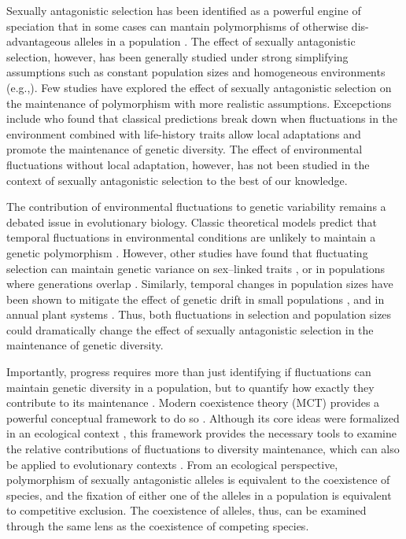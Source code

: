 \documentclass[12pt]{article}
\begin{document}
Sexually antagonistic selection has been identified as a powerful engine of speciation that in some cases can mantain polymorphisms of otherwise dis-advantageous alleles in a population \citep{gavrilets2014sexual}. The effect of sexually antagonistic selection, however, has been generally studied under strong simplifying assumptions such as constant population sizes and homogeneous environments (e.g.,\citet{kidwell1977regions, pamilo1979genic, immler2012ploidally}). Few studies have explored the effect of sexually antagonistic selection on the maintenance of polymorphism with more realistic assumptions. Excepctions include \citet{connallon_evolutionary_2018} who found that classical predictions break down when fluctuations in the environment combined with life-history traits allow local adaptations and promote the maintenance of genetic diversity. The effect of environmental fluctuations without local adaptation, however, has not been studied in the context of sexually antagonistic selection to the best of our knowledge.


The contribution of environmental fluctuations to genetic variability remains a debated issue in evolutionary biology. Classic theoretical models predict that temporal fluctuations in environmental conditions are unlikely to maintain a genetic polymorphism \citep{hedrick1974genetic,hedrick1986genetic}. However, other studies have found that fluctuating selection can maintain genetic variance on sex--linked traits \citep{reinhold2000maintenance}, or in populations where generations overlap \citep{ellner1994role, ellner1996patterns}. Similarly, temporal changes in population sizes have been shown to mitigate the effect of genetic drift in small populations \citep{pemberton1996maintenance}, and in annual plant systems \citep{nunney2002effective}. Thus, both fluctuations in selection and population sizes could dramatically change the effect of sexually antagonistic selection in the maintenance of genetic diversity.


Importantly, progress requires more than just identifying if fluctuations can maintain genetic diversity in a population, but to quantify how exactly they contribute to its maintenance \citep{ellner2016quantify}. Modern coexistence theory (MCT) provides a powerful conceptual framework to do so \citep{Chesson2000,chesson1994multispecies, barabas_chessons_2018}. Although its core ideas were formalized in an ecological context \citep{chesson1994multispecies,chesson2000general}, this framework provides the necessary tools to examine the relative contributions of fluctuations to diversity maintenance, which can also be applied to evolutionary contexts  \citep{ellner1996patterns,reinhold2000maintenance}. From an ecological perspective, polymorphism of sexually antagonistic alleles is equivalent to the coexistence of species, and the fixation of either one of the alleles in a population is equivalent to competitive exclusion. The coexistence of alleles, thus, can be examined through the same lens as the coexistence of competing species.
\end{document}
